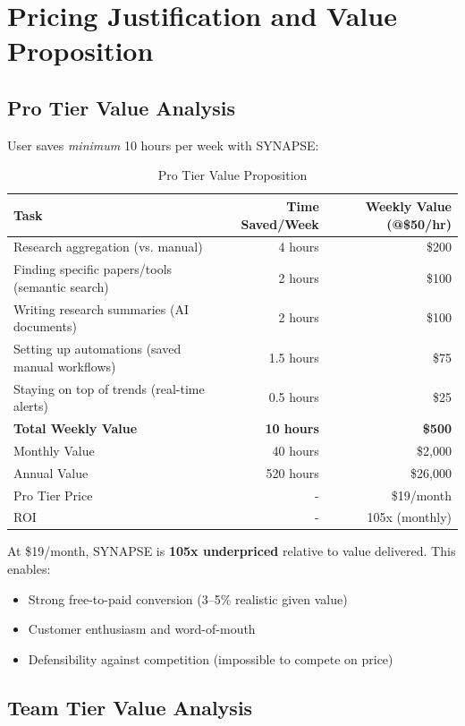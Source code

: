 \documentclass{report}
\begin{document}
\section{Pricing Justification and Value Proposition}

\subsection{Pro Tier Value Analysis}

User saves \textit{minimum} 10 hours per week with SYNAPSE:

\begin{table}[h]
\centering
\begin{tabular}{|l|r|r|}
\toprule
\textbf{Task} & \textbf{Time Saved/Week} & \textbf{Weekly Value (@\$50/hr)} \\
\midrule
Research aggregation (vs. manual) & 4 hours & \$200 \\
Finding specific papers/tools (semantic search) & 2 hours & \$100 \\
Writing research summaries (AI documents) & 2 hours & \$100 \\
Setting up automations (saved manual workflows) & 1.5 hours & \$75 \\
Staying on top of trends (real-time alerts) & 0.5 hours & \$25 \\
\midrule
\textbf{Total Weekly Value} & \textbf{10 hours} & \textbf{\$500} \\
\midrule
Monthly Value & 40 hours & \$2,000 \\
Annual Value & 520 hours & \$26,000 \\
\midrule
Pro Tier Price & - & \$19/month \\
ROI & - & 105x (monthly) \\
\bottomrule
\end{tabular}
\caption{Pro Tier Value Proposition}
\end{table}

At \$19/month, SYNAPSE is \textbf{105x underpriced} relative to value delivered. This enables:
\begin{itemize}
    \item Strong free-to-paid conversion (3--5\% realistic given value)
    \item Customer enthusiasm and word-of-mouth
    \item Defensibility against competition (impossible to compete on price)
\end{itemize}

\subsection{Team Tier Value Analysis}
\end{document}
